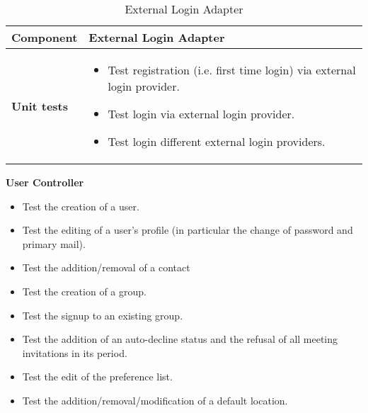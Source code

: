 \begin{table}[H]	
	\centering
	\def\arraystretch{1.5}
	\begin{tabular}{|m{4cm}|m{12cm}|}
		\hline
		\textbf{Component} & External Login Adapter \\ \hline
		\textbf{Unit tests} & 
			\begin{itemize}
			\item Test registration (i.e. first time login) via external login provider.
			\item Test login via external login provider.
			\item Test login different external login providers.
			\end{itemize} \\ \hline
	\end{tabular}
	\caption{External Login Adapter}
\end{table}

\textbf{User Controller}

\begin{itemize}
\item Test the creation of a user.
\item Test the editing of a user's profile (in particular the change of password and primary mail).
\item Test the addition/removal of a contact
\item Test the creation of a group.
\item Test the signup to an existing group.
\item Test the addition of an auto-decline status and the refusal of all meeting invitations in its period.
\item Test the edit of the preference list.
\item Test the addition/removal/modification of a default location.
\end{itemize}

